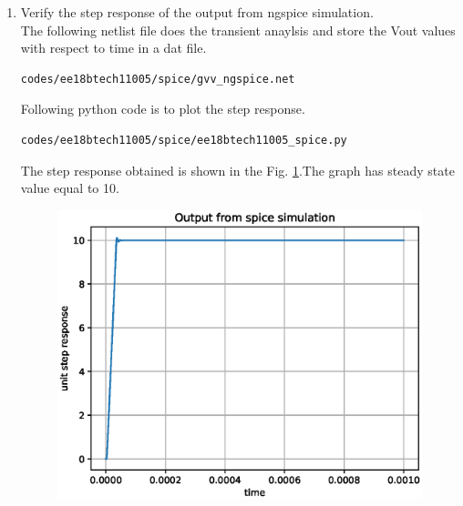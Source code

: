 \begin{enumerate}[label=\arabic*.,ref=\theenumi]
\item Verify the step response of the output from ngspice simulation.\\
\solution The following netlist file does the transient anaylsis and store the Vout values with respect to time in a dat file. 
\begin{lstlisting}
codes/ee18btech11005/spice/gvv_ngspice.net
\end{lstlisting}
Following python code is to plot the step response.
\begin{lstlisting}
codes/ee18btech11005/spice/ee18btech11005_spice.py
\end{lstlisting}
The step response obtained is shown in the Fig. \ref{fig:ee18btech11005_3}.The graph has steady state value equal to 10.
\begin{figure}[!ht]
\centering
\includegraphics[width=\columnwidth]{./figs/ee18btech11005/ee18btech11005_spice.eps}
\caption{}
\label{fig:ee18btech11005_3}
\end{figure}
\end{enumerate}



